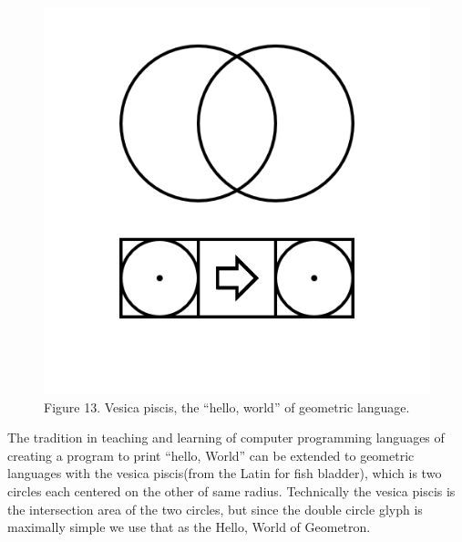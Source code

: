 \documentclass[11pt]{article}
\begin{document}
\begin{figure}

\includegraphics[width=\linewidth]{figures/figure13_vesicaPisces.png}

\caption{Figure 13. Vesica piscis, the ``hello, world'' of geometric language.}
\end{figure}




    The tradition in teaching and learning of computer programming languages of creating a program to print ``hello, World'' can be extended to geometric languages with the vesica piscis(from the Latin for fish bladder), which is two circles each centered on the other of same radius.  Technically the vesica piscis is the intersection area of the two circles, but since the double circle glyph is maximally simple we use that as the Hello, World of Geometron.
\end{document}
